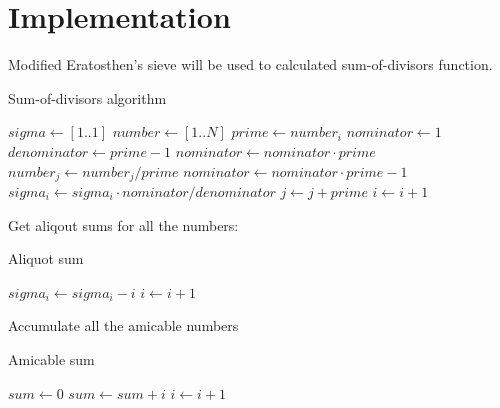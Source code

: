 \documentclass{article}
\begin{document}
\section{Implementation}
Modified Eratosthen's sieve will be used to calculated sum-of-divisors function.
\begin{algorithm}
    \caption{Sum-of-divisors algorithm}\label{alg:sigma_1}
    \begin{algorithmic}[1]
        \State $sigma \gets [1 .. 1]$ 
        \State $number \gets [1 .. N]$
             
                \State $prime \gets number_i$
                 
                    \State $nominator \gets 1$
                    \State $denominator \gets prime - 1$
                     
                        \State $nominator \gets nominator \cdot prime$
                        \State $number_j \gets number_j / prime$
                    \EndWhile
                    \State $nominator \gets nominator \cdot prime - 1$
                    \State $sigma_i \gets sigma_i \cdot nominator / denominator$
                \State $j \gets j + prime$
                \EndFor
            \EndIf
            \State $i \gets i + 1$
        \EndFor
    \end{algorithmic}
\end{algorithm}

Get aliqout sums for all the numbers:
\begin{algorithm}
    \caption{Aliquot sum} \label{alg:aliqout}
    \begin{algorithmic}[1]
            \State $sigma_i \gets sigma_i - i$
            \State $i \gets i + 1$
        \EndFor
    \end{algorithmic}
\end{algorithm}
\newpage
Accumulate all the amicable numbers
\begin{algorithm}
    \caption{Amicable sum} \label{alg:amicable}
    \begin{algorithmic}[1]
        \State $sum \gets 0$
            \State $sum \gets sum + i$
            \EndIf
            \State $i \gets i + 1$
        \EndFor
    \end{algorithmic}
\end{algorithm}
\end{document}
